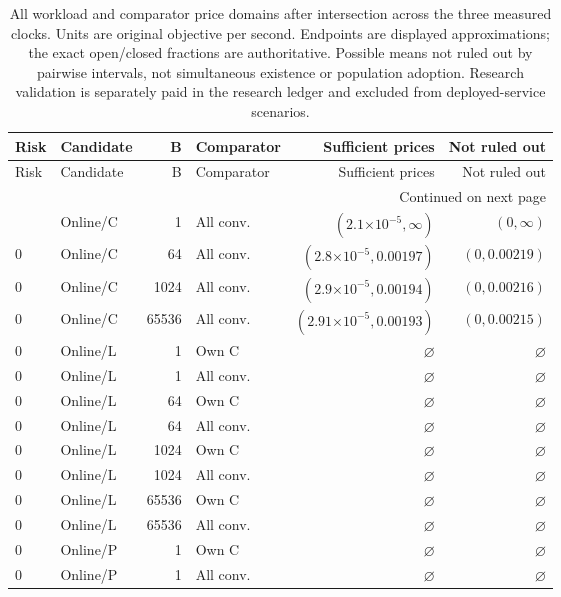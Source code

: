 \begingroup
\scriptsize
\setlength{\tabcolsep}{3pt}
\begin{longtable}{llrlrr}
\caption{All workload and comparator price domains after intersection across the three measured clocks. Units are original objective per second. Endpoints are displayed approximations; the exact open/closed fractions are authoritative. Possible means not ruled out by pairwise intervals, not simultaneous existence or population adoption. Research validation is separately paid in the research ledger and excluded from deployed-service scenarios.}\label{tab:allprices120}\\
\toprule
Risk & Candidate & B & Comparator & Sufficient prices & Not ruled out \\ \midrule
\endfirsthead
\toprule
Risk & Candidate & B & Comparator & Sufficient prices & Not ruled out \\ \midrule
\endhead
\midrule\multicolumn{6}{r}{Continued on next page}\\\endfoot
\bottomrule\endlastfoot
0 & Online/C & 1 & All conv. & $(2.1\mathord{\times}10^{-5}, \infty)$ & $(0, \infty)$ \\
0 & Online/C & 64 & All conv. & $(2.8\mathord{\times}10^{-5}, 0.00197)$ & $(0, 0.00219)$ \\
0 & Online/C & 1024 & All conv. & $(2.9\mathord{\times}10^{-5}, 0.00194)$ & $(0, 0.00216)$ \\
0 & Online/C & 65536 & All conv. & $(2.91\mathord{\times}10^{-5}, 0.00193)$ & $(0, 0.00215)$ \\
0 & Online/L & 1 & Own C & $\varnothing$ & $\varnothing$ \\
0 & Online/L & 1 & All conv. & $\varnothing$ & $\varnothing$ \\
0 & Online/L & 64 & Own C & $\varnothing$ & $\varnothing$ \\
0 & Online/L & 64 & All conv. & $\varnothing$ & $\varnothing$ \\
0 & Online/L & 1024 & Own C & $\varnothing$ & $\varnothing$ \\
0 & Online/L & 1024 & All conv. & $\varnothing$ & $\varnothing$ \\
0 & Online/L & 65536 & Own C & $\varnothing$ & $\varnothing$ \\
0 & Online/L & 65536 & All conv. & $\varnothing$ & $\varnothing$ \\
0 & Online/P & 1 & Own C & $\varnothing$ & $\varnothing$ \\
0 & Online/P & 1 & All conv. & $\varnothing$ & $\varnothing$ \\

\end{longtable}
